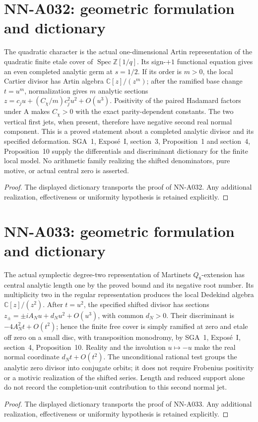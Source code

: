 \section{NN-A032: geometric formulation and dictionary}
\begin{geometricstatement}[NN-A032]
The quadratic character is the actual one-dimensional Artin representation of the quadratic finite etale cover of $\operatorname{Spec}\mathbb Z[1/q]$. Its sign-$+1$ functional equation gives an even completed analytic germ at $s=1/2$. If its order is $m>0$, the local Cartier divisor has Artin algebra $\mathbb C[z]/(z^m)$; after the ramified base change $t=u^m$, normalization gives $m$ analytic sections $z=c_ju+(C_\chi/m)c_j^2u^2+O(u^3)$. Positivity of the paired Hadamard factors under A makes $C_\chi>0$ with the exact parity-dependent constants. The two vertical first jets, when present, therefore have negative second real normal component. This is a proved statement about a completed analytic divisor and its specified deformation. SGA~1, Expos\'e~I, section~3, Proposition~1 and section~4, Proposition~10 supply the differentials and discriminant dictionary for the finite local model. No arithmetic family realizing the shifted denominators, pure motive, or actual central zero is asserted.
\end{geometricstatement}
\begin{proof} The displayed dictionary transports the proof of NN-A032. Any additional realization, effectiveness or uniformity hypothesis is retained explicitly.\end{proof}


\section{NN-A033: geometric formulation and dictionary}
\begin{geometricstatement}[NN-A033]
The actual symplectic degree-two representation of Martinet\textquotesingle s $Q_8$-extension has central analytic length one by the proved bound and its negative root number. Its multiplicity two in the regular representation produces the local Dedekind algebra $\mathbb C[z]/(z^2)$. After $t=u^2$, the specified shifted divisor has sections $z_\pm=\pm iA_Nu+d_Nu^2+O(u^3)$, with common $d_N>0$. Their discriminant is $-4A_N^2t+O(t^2)$; hence the finite free cover is simply ramified at zero and etale off zero on a small disc, with transposition monodromy, by SGA~1, Expos\'e~I, section~4, Proposition~10. Reality and the involution $u\mapsto-u$ make the real normal coordinate $d_Nt+O(t^2)$. The unconditional rational test groups the analytic zero divisor into conjugate orbits; it does not require Frobenius positivity or a motivic realization of the shifted series. Length and reduced support alone do not record the completion-unit contribution to this second normal jet.
\end{geometricstatement}
\begin{proof} The displayed dictionary transports the proof of NN-A033. Any additional realization, effectiveness or uniformity hypothesis is retained explicitly.\end{proof}


